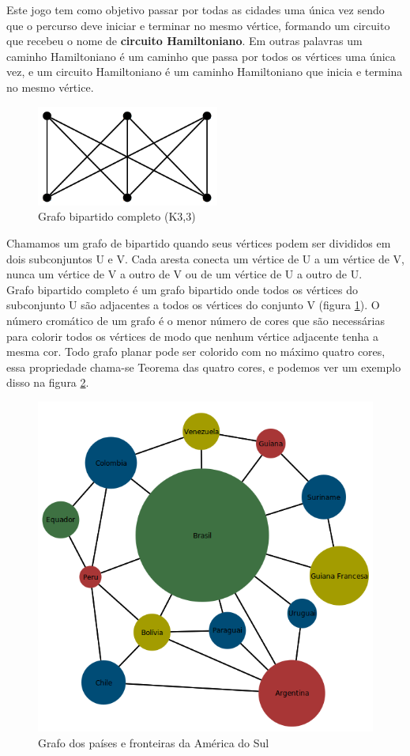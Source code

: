 \documentclass[a4paper]{abnt}
\begin{document}
Este jogo tem como objetivo passar por todas as cidades uma única vez sendo que o percurso deve iniciar e terminar no mesmo vértice, formando um circuito que recebeu o nome de \textbf{circuito Hamiltoniano}. Em outras palavras um caminho Hamiltoniano é um caminho que passa por todos os vértices uma única vez, e um circuito Hamiltoniano é um caminho Hamiltoniano que inicia e termina no mesmo vértice.

\begin{figure}[htb]
    \centering
	\includegraphics[width=6cm]{k33.png}
	\caption{Grafo bipartido completo (K3,3)}
	\label{img_k33}
\end{figure}

Chamamos um grafo de bipartido quando seus vértices podem ser divididos em dois subconjuntos U e V.  Cada aresta conecta um vértice de U a um vértice de V, nunca um vértice de V a outro de V ou de um vértice de U a outro de U.\\Grafo bipartido completo é um grafo bipartido onde todos os vértices do subconjunto U são adjacentes a todos os vértices do conjunto V (figura \ref{img_k33}).
O número cromático de um grafo é o menor número de cores que são necessárias para colorir todos os vértices de modo que nenhum vértice adjacente tenha a mesma cor. Todo grafo planar pode ser colorido com no máximo quatro cores, essa propriedade chama-se Teorema das quatro cores, e podemos ver um exemplo disso na figura \ref{img_graph_color}.

\begin{figure}[htb]
    \centering
	\includegraphics[width=12cm]{graph_color.png}
	\caption{Grafo dos países e fronteiras da América do Sul}
	\label{img_graph_color}
\end{figure}
\end{document}
